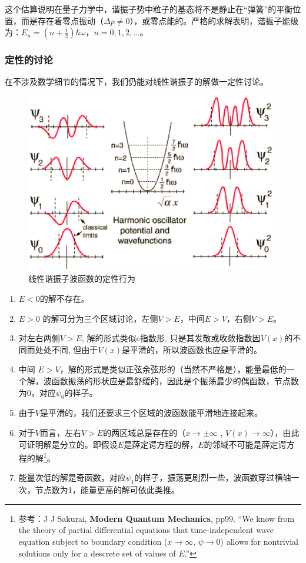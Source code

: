 这个估算说明在量子力学中，谐振子势中粒子的基态将不是静止在“弹簧”的平衡位置，而是存在着零点振动（$\Delta
p \ne 0$），或零点能的。严格的求解表明，谐振子能级为：$E_n =(
n+\frac{1}{2} ) \hbar \omega$，$n=0,1,2,...$。

\subsubsection{定性的讨论}

在不涉及数学细节的情况下，我们仍能对线性谐振子的解做一定性讨论。


\begin{figure}[h]
\begin{center}
\includegraphics[clip,width=11cm]{1DProblem/HarmonicOscillator.ps}
\caption{线性谐振子波函数的定性行为}
\end{center}
\end{figure}


\begin{enumerate}
  \item $E<0$的解不存在。
  \item $E>0$ 的解可分为三个区域讨论，左侧$V>E$，中间$E>V$，右侧$V>E$。
  \item 对左右两侧$V>E$, 解的形式类似$e$指数形, 只是其发散或收敛指数因$V(x)$的不同而处处不同, 但由于$V(x)$是平滑的，所以波函数也应是平滑的。
  \item 中间 $E>V$，解的形式是类似正弦余弦形的（当然不严格是），能量最低的一个解，波函数振荡的形状应是最舒缓的，因此是个振荡最少的偶函数，节点数为0，对应$\psi_0$的样子。
  \item 由于$V$是平滑的，我们还要求三个区域的波函数能平滑地连接起来。
  \item 对于$V$而言，左右$V>E$的两区域总是存在的（$x \to \pm \infty$ , $V(x) \to \infty$），由此可证明解是分立的。即假设$E$是薛定谔方程的解，$E$的邻域不可能是薛定谔方程的解\footnote{参考：J J Sakurai, \textbf{Modern Quantum Mechanics}, pp99. ``We know from the theory of partial differential equations that time-independent wave equation subject to boundary condition ($x \to \infty$, $\psi \to 0$) allows for nontrivial solutions only for a descrete set of values of $E$.''}。
  \item 能量次低的解是奇函数，对应$\psi_1$的样子，振荡更剧烈一些，波函数穿过横轴一次，节点数为1，能量更高的解可依此类推。
\end{enumerate}


